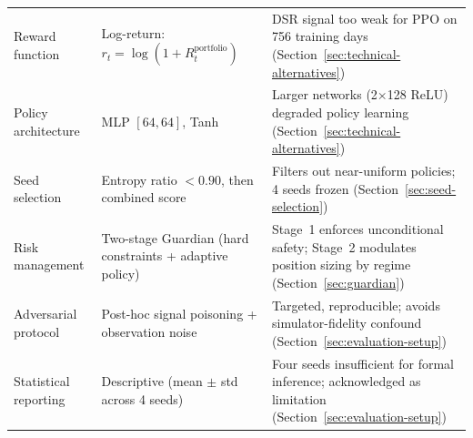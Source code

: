 \begin{table}[ht]
\begin{tabular}{@{}p{3.2cm}p{4.5cm}p{5.8cm}@{}}
Reward function
  & Log-return: $r_t = \log(1 + R_t^{\text{portfolio}})$
  & DSR signal too weak for PPO on 756 training days
    (Section~\ref{sec:technical-alternatives}) \\[4pt]

Policy architecture
  & MLP $[64, 64]$, Tanh
  & Larger networks (2$\times$128 ReLU) degraded policy learning
    (Section~\ref{sec:technical-alternatives}) \\[4pt]

Seed selection
  & Entropy ratio $< 0.90$, then combined score
  & Filters out near-uniform policies; 4 seeds frozen
    (Section~\ref{sec:seed-selection}) \\[4pt]

Risk management
  & Two-stage Guardian (hard constraints + adaptive policy)
  & Stage~1 enforces unconditional safety; Stage~2 modulates position
    sizing by regime
    (Section~\ref{sec:guardian}) \\[4pt]

Adversarial protocol
  & Post-hoc signal poisoning + observation noise
  & Targeted, reproducible; avoids simulator-fidelity confound
    (Section~\ref{sec:evaluation-setup}) \\[4pt]

Statistical reporting
  & Descriptive (mean $\pm$ std across 4 seeds)
  & Four seeds insufficient for formal inference; acknowledged as
    limitation
    (Section~\ref{sec:evaluation-setup}) \\
\bottomrule
\end{tabular}
\end{table}




